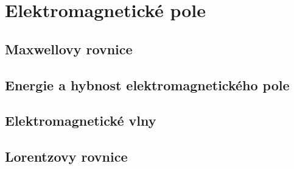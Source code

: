 \graphicspath{{../src/FYZ/img/}}
\setchaptertoc
\chapter{Elektromagnetické pole}\label{fyz:IIIchapV}
  \section{Maxwellovy rovnice}\label{fyz:IIIchapVsecI}
  \section{Energie a hybnost elektromagnetického pole}\label{fyz:IIIchapVsecII}
  \section{Elektromagnetické vlny}\label{fyz:IIIchapVsecIII}
  \section{Lorentzovy rovnice}\label{fyz:IIIchapVsecIV}
